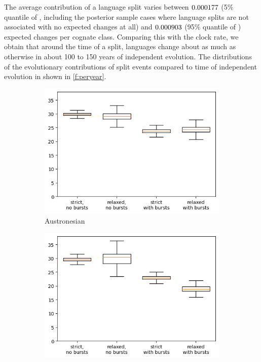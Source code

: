 \documentclass[]{rsos}%
\begin{document}
The average contribution of a language split varies between $0.000177$ (5\%
quantile of \minn, including the posterior sample cases where language splits are not associated with no expected changes at all) and $0.000903$ (95\% quantile of \maxn)
expected changes per cognate class. Comparing this with the clock rate, we obtain
that around the time of a split, languages change about as much as otherwise in
about 100 to 150 years of independent evolution. The distributions of the
evolutionary contributions of split events compared to time of independent
evolution in shown in \cref{f:peryear}.

\begin{figure}
  \centering
  \begin{subfigure}{0.4\textwidth}
    \includegraphics[width=\textwidth]{supplement/analysis/austronesian_replacement.png}
    \caption{Austronesian}
  \end{subfigure}
  \begin{subfigure}{0.4\textwidth}
    \includegraphics[width=\textwidth]{supplement/analysis/bantu_replacement.png}

\end{subfigure}
\end{figure}
\end{document}
